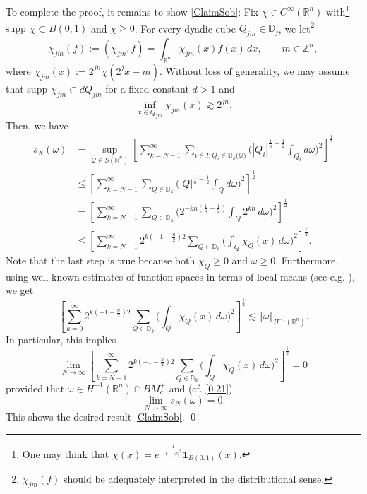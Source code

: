 \documentclass[11pt, a4paper,leqno]{amsart}
\theoremstyle{plain}
\numberwithin{equation}{section}
\theoremstyle{definition}
\theoremstyle{remark}
\def\R{\mathbb{R}}
\begin{document}
To complete the proof, it remains to show \eqref{ClaimSob}: 
Fix $\chi\in C^{\infty}(\mathbb{R}^{n})$ with\footnote{One may think that
$\chi(x) = e^{-\frac{1}{1-|x|^{2}}} \mathbf{1}_{B(0, 1)}(x)$.} $\text{supp }
\chi\subset B(0, 1)$ and $\chi\geq0$. For every dyadic cube $Q_{j m}
\in\mathbb{D}_{j}$, we let\footnote{$\chi_{j m}(f)$ should be adequately
interpreted in the distributional sense.}
\begin{equation}
\label{Chijm}\chi_{j m}(f) := (\chi_{j m}, f) = \int_{\mathbb{R}^{n}} \chi_{j
m}(x) f(x) \, dx, \qquad m \in\mathbb{Z}^{n},
\end{equation}
where $\chi_{j m}(x) := 2^{j n} \chi(2^{j} x -m)$. Without loss of generality,
we may assume that $\text{supp } \chi_{j m} \subset d Q_{j m}$ for a fixed
constant $d > 1$ and
\begin{equation}
\label{11e}\inf_{x \in Q_{j m}} \chi_{j m}(x) \gtrsim2^{j n}.
\end{equation}
 Then,
we have
\begin{align}
s_{N}(\omega) &  =\sup_{\mathcal{Q}\in
S(\R^n)}\left[\sum_{k=N-1}^{\infty}\sum_{i\in I:Q_{i}\in\mathbb{D}_{k}(\mathcal{Q)}%
}\Big(|Q_{i}|^{\frac{1}{n}-\frac{1}{2}}\int_{Q_{i}}d\omega\Big)^{2}%
\right]^{\frac{1}{2}}\nonumber\\
&  \leq\left[\sum_{k=N-1}^{\infty}\sum_{Q\in\mathbb{D}_{k}}\Big(|Q|^{\frac
{1}{n}-\frac{1}{2}}\int_{Q}d\omega\Big)^{2}\right]^{\frac{1}{2}}\nonumber\\
&  =\left[\sum_{k=N-1}^{\infty}\sum_{Q\in\mathbb{D}_{k}}\Big(2^{-kn(\frac
{1}{n}+\frac{1}{2})}\int_{Q}2^{kn}\,d\omega\Big)^{2}\right]^{\frac{1}{2}%
}\nonumber\\
&  \leq\left[\sum_{k=N-1}^{\infty}2^{k(-1-\frac{n}{2})2}\sum_{Q\in
\mathbb{D}_{k}}\Big(\int_{Q}\chi_{Q}(x)\,d\omega\Big)^{2}\right]^{\frac{1}{2}%
}.\label{0.21}%
\end{align}
Note that the last step is true because both $\chi_{Q}\geq0$ and $\omega\geq
0$. Furthermore, using well-known estimates of function spaces in terms of local means  (see e.g. \cite[Theorem 1.15]{Triebel}), we get
\[
\left[\sum_{k=0}^{\infty}2^{k(-1-\frac{n}{2})2}\sum_{Q\in\mathbb{D}_{k}%
}\Big(\int_{Q}\chi_{Q}(x)\,d\omega\Big)^{2}\right]^{\frac{1}{2}}\lesssim
\Vert\omega\Vert_{H^{-1}(\R^n)}.
\]
In particular, this implies
\[
\lim_{N\rightarrow\infty}\left[\sum_{k=N-1}^{\infty}2^{k(-1-\frac{n}{2})2}%
\sum_{Q\in\mathbb{D}_{k}}\Big(\int_{Q}\chi_{Q}(x)\,d\omega\Big)^{2}%
\right]^{\frac{1}{2}}=0
\]
provided that $\omega\in H^{-1}(\R^n)\cap BM^{+}_c$ and (cf. \eqref{0.21})
\[
\lim_{N\rightarrow\infty} s_{N}(\omega)=0.
\]
This shows the desired result \eqref{ClaimSob}. \qed
\end{document}
